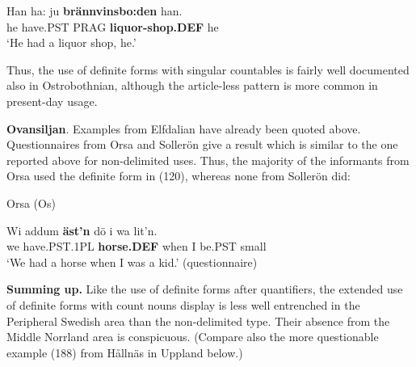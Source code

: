  \ea\label{}
\gll Han  ha:  ju  \textbf{brännvinsbo:den} han.  \\


he  have.PST  PRAG  \textbf{liquor-shop.DEF} he  \\

\glt ‘He had a liquor shop, he.’ 

\z

Thus, the use of definite forms with singular countables is fairly well documented also in Ostrobothnian, although the article-less pattern is more common in present-day usage.


\textbf{Ovansiljan}. Examples from Elfdalian have already been quoted above. Questionnaires from Orsa and Sollerön give a result which is similar to the one reported above for non-delimited uses. Thus, the majority of the informants from Orsa used the definite form in (120), whereas none from Sollerön did:


\item 

\label{bkm:Ref224103820}Orsa (Os)



 \ea\label{}
\gll Wi  addum  \textbf{äst’n} dö  i  wa  lit’n.\\


we  have.PST.1PL  \textbf{horse.DEF} when  I   be.PST  small\\

\glt ‘We had a horse when I was a kid.’ (questionnaire)

\z

\textbf{Summing up.} Like the use of definite forms after quantifiers, the extended use of definite forms with count nouns display is less well entrenched in the Peripheral Swedish area than the non-delimited type. Their absence from the Middle Norrland area is conspicuous. (Compare also the more questionable example (188) from Hållnäs in Uppland below.)

